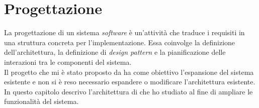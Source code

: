 \section{Progettazione}\label{chap:progettazione}

La progettazione di un sistema \textit{software} è un'attività che traduce i requisiti in una struttura concreta per 
l'implementazione. Essa coinvolge la definizione dell'architettura, la definizione di \textit{design pattern} e la 
pianificazione delle interazioni tra le componenti del sistema.\\
Il progetto che mi è stato proposto da {\company} ha come obiettivo l'espansione del sistema esistente e non si è reso 
necessario espandere o modificare l'architettura esistente.\\
In questo capitolo descrivo l'architettura di {\movi} che ho studiato al fine di ampliare le funzionalità del sistema.







